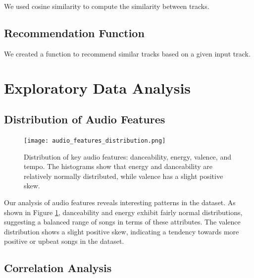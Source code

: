 \documentclass[runningheads]{llncs}
\begin{document}
We used cosine similarity to compute the similarity between tracks.

\subsection{Recommendation Function}

We created a function to recommend similar tracks based on a given input track.

\section{Exploratory Data Analysis}

\subsection{Distribution of Audio Features}

\begin{figure}[h]
\centering
\texttt{[image: audio\_features\_distribution.png]}
\caption{Distribution of key audio features: danceability, energy, valence, and tempo. The histograms show that energy and danceability are relatively normally distributed, while valence has a slight positive skew.}
\label{fig:audio_features}
\end{figure}

Our analysis of audio features reveals interesting patterns in the dataset. As shown in Figure \ref{fig:audio_features}, danceability and energy exhibit fairly normal distributions, suggesting a balanced range of songs in terms of these attributes. The valence distribution shows a slight positive skew, indicating a tendency towards more positive or upbeat songs in the dataset.

\subsection{Correlation Analysis}
\end{document}
